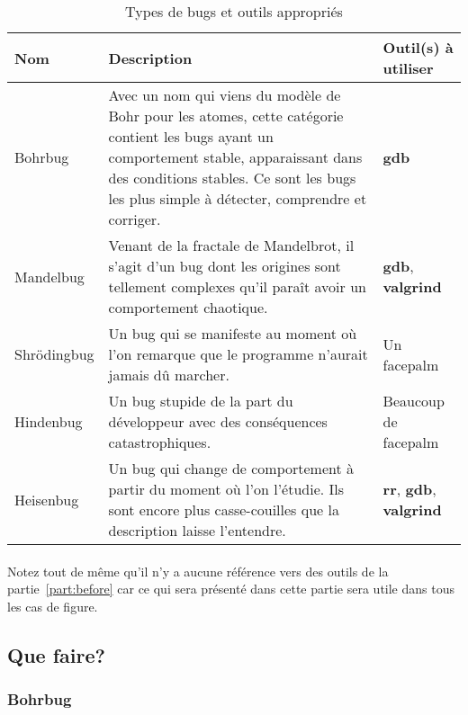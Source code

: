 \begin{table}[H]
	\centering
	\begin{tabular}{lp{20em}p{9em}}
		\toprule
		\textbf{Nom} & \textbf{Description} & \textbf{Outil(s) à utiliser}\\
		\midrule
		Bohrbug & Avec un nom qui viens du modèle de Bohr pour les atomes,
			cette catégorie contient les bugs ayant un comportement stable,
			apparaissant dans des conditions stables. Ce sont les bugs les plus
			simple à détecter, comprendre et corriger. & \textbf{gdb}\\
		Mandelbug & Venant de la fractale de Mandelbrot, il s'agit d'un bug
			dont les origines sont tellement complexes qu'il paraît avoir un
			comportement chaotique. & \textbf{gdb}, \textbf{valgrind}\\
		Shrödingbug & Un bug qui se manifeste au moment où l'on remarque que
			le programme n'aurait jamais dû marcher. & Un facepalm\\
		Hindenbug & Un bug stupide de la part du développeur avec des
			conséquences catastrophiques. & Beaucoup de facepalm\\
		Heisenbug & Un bug qui change de comportement à partir du moment où
			l'on l'étudie. Ils sont encore plus casse-couilles que la
			description laisse l'entendre. & \textbf{rr}, \textbf{gdb},
			\textbf{valgrind} \\
		\bottomrule
	\end{tabular}%
	\label{tab:bugtypes}
	\caption{Types de bugs et outils appropriés}
\end{table}

\paragraph{}

Notez tout de même qu'il n'y a aucune référence vers des outils de la
partie~\ref{part:before} car ce qui sera présenté dans cette partie sera utile
dans tous les cas de figure.

\subsection{Que faire?}

\subsubsection{Bohrbug}

\paragraph{}

